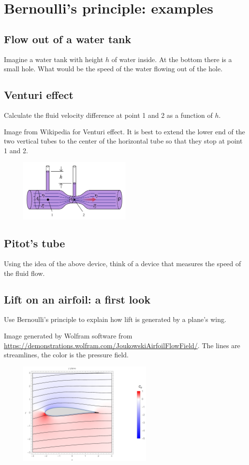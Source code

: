 \documentclass[11pt,letterpaper]{article}
\begin{document}
\section{Bernoulli's principle: examples}
\subsection{Flow out of a water tank}
Imagine a water tank with height $h$ of water inside. At the bottom there is a small hole. What would be the speed of the water flowing out of the hole.

\subsection{Venturi effect}
Calculate the fluid velocity difference at point 1 and 2 as a function of $h$.

Image from Wikipedia for Venturi effect. It is best to extend the lower end of the two vertical tubes to the center of the horizontal tube so that they stop at point 1 and 2.
\begin{figure}[H]
    \centering
    \includegraphics[width=0.5\textwidth]{figs/Venturi_wiki}
\end{figure}

\subsection{Pitot's tube}
Using the idea of the above device, think of a device that measures the speed of the fluid flow.

\subsection{Lift on an airfoil: a first look}
Use Bernoulli's principle to explain how lift is generated by a plane's wing.

Image generated by Wolfram software from \url{https://demonstrations.wolfram.com/JoukowskiAirfoilFlowField/}. The lines are streamlines, the color is the pressure field.
\begin{figure}[H]
    \centering
    \includegraphics[width=0.6\textwidth]{figs/Airfoil}
\end{figure}
\end{document}
